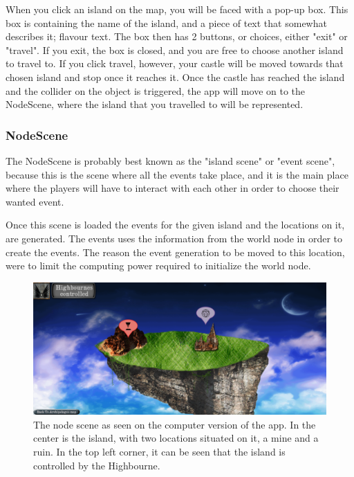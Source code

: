 When you click an island on the map, you will be faced with a pop-up box. This box is containing the name of the island, and a piece of text that somewhat describes it; flavour text. The box then has 2 buttons, or choices, either "exit" or "travel". If you exit, the box is closed, and you are free to choose another island to travel to. If you click travel, however, your castle will be moved towards that chosen island and stop once it reaches it. 
Once the castle has reached the island and the collider on the object is triggered, the app will move on to the NodeScene, where the island that you travelled to will be represented.

\subsubsection{NodeScene}
\label{sec:nodeScene}
The NodeScene is probably best known as the "island scene" or "event scene", because this is the scene where all the events take place, and it is the main place where the players will have to interact with each other in order to choose their wanted event.

Once this scene is loaded the events for the given island and the locations on it, are generated. The events uses the information from the world node in order to create the events. The reason the event generation to be moved to this location, were to limit the computing power required to initialize the world node. 

\begin{figure}[h]
    \centering
    \includegraphics[scale=0.3]{Images/NodeScene.png}
    \caption{The node scene as seen on the computer version of the app. In the center is the island, with two locations situated on it, a mine and a ruin. In the top left corner, it can be seen that the island is controlled by the Highbourne.}
    \label{fig:nodescene}
\end{figure}

